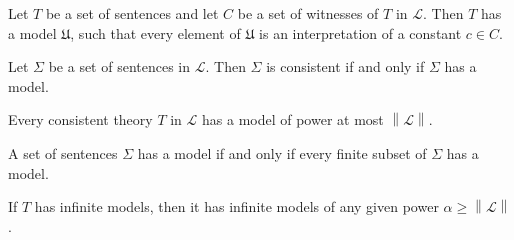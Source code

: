 \documentclass[../../main.tex]{subfiles}
\begin{document}
\begin{lemma}\cite[Lemma 2.1.2]{Cha90}
    Let $T$ be a set of sentences and let $C$ be a set of witnesses of $T$ in $\mathcal{L}$.
    Then $T$ has a model $\mathfrak{U}$, such that every element of $\mathfrak{U}$ is an interpretation of a constant $c \in C$.
\end{lemma} 

\begin{theorem}\cite[Theorem 1.3.21]{Cha90}
    Let $\Sigma$ be a set of sentences in $\mathcal{L}$.
    Then $\Sigma$ is consistent if and only if $\Sigma$ has a model.
\end{theorem}

\begin{theorem}\label{down-lowenheim-skolem}\cite[Corollary 2.1.4]{Cha90}
    Every consistent theory $T$ in $\mathcal{L}$ has a model of power at most $\left\lVert \mathcal{L} \right\rVert$.
\end{theorem}

\begin{theorem}\cite[Theorem 1.3.22]{Cha90}
    A set of sentences $\Sigma$ has a model if and only if every finite subset of $\Sigma$ has a model.
\end{theorem}

\begin{theorem}\label{up-lowenheim-skolem}\cite[Corollary 2.1.6]{Cha90}
    If $T$ has infinite models, then it has infinite models of any given power $\alpha \geq \left\lVert \mathcal{L} \right\rVert$.
\end{theorem}
\end{document}
